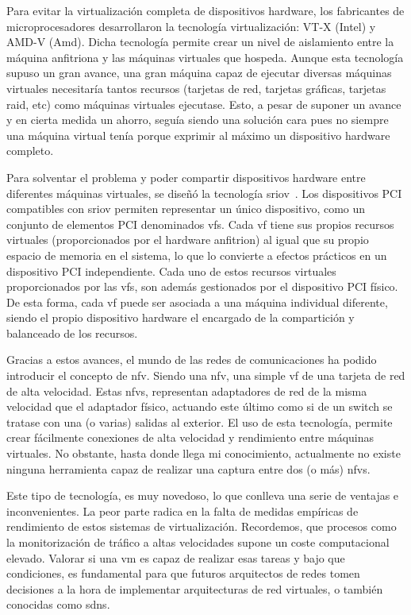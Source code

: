 Para evitar la virtualización completa de dispositivos hardware, los fabricantes de microprocesadores desarrollaron la tecnología virtualización: VT-X (Intel) y AMD-V (Amd). Dicha tecnología permite crear un nivel de aislamiento entre la máquina anfitriona y las máquinas virtuales que hospeda. Aunque esta tecnología supuso un gran avance, una gran máquina capaz de ejecutar diversas máquinas virtuales necesitaría tantos recursos (tarjetas de red, tarjetas gráficas, tarjetas raid, etc) como máquinas virtuales ejecutase. Esto, a pesar de suponer un avance y en cierta medida un ahorro, seguía siendo una solución cara pues no siempre una máquina virtual tenía porque exprimir al máximo un dispositivo hardware completo.

Para solventar el problema y poder compartir dispositivos hardware entre diferentes máquinas virtuales, se diseñó la tecnología \gls{sriov}~\cite{bib:introduccion:sriov}.
Los dispositivos PCI compatibles con \gls{sriov} permiten representar un único dispositivo, como un conjunto de elementos PCI denominados \glspl{vf}. Cada \gls{vf} tiene sus propios recursos virtuales (proporcionados por el hardware anfitrion) al igual que su propio espacio de memoria en el sistema, lo que lo convierte a efectos prácticos en un dispositivo PCI independiente. Cada uno de estos recursos virtuales proporcionados por las \glspl{vf}, son además gestionados por el dispositivo PCI físico. De esta forma, cada \gls{vf} puede ser asociada a una máquina individual diferente, siendo el propio dispositivo hardware el encargado de la compartición y balanceado de los recursos.

Gracias a estos avances, el mundo de las redes de comunicaciones ha podido introducir el concepto de \gls{nfv}. Siendo una \gls{nfv}, una simple \gls{vf} de una tarjeta de red de alta velocidad. Estas \glspl{nfv}, representan adaptadores de red de la misma velocidad que el adaptador físico, actuando este último como si de un switch se tratase con una (o varias) salidas al exterior. El uso de esta tecnología, permite crear fácilmente conexiones de alta velocidad y rendimiento entre máquinas virtuales. No obstante, hasta donde llega mi conocimiento, actualmente no existe ninguna herramienta capaz de realizar una captura entre dos (o más) \glspl{nfv}.

Este tipo de tecnología, es muy novedoso, lo que conlleva una serie de ventajas e inconvenientes. La peor parte radica en la falta de medidas empíricas de rendimiento de estos sistemas de virtualización. Recordemos, que procesos como la monitorización de tráfico a altas velocidades supone un coste computacional elevado. Valorar si una \gls{vm} es capaz de realizar esas tareas y bajo que condiciones, es fundamental para que futuros arquitectos de redes tomen decisiones a la hora de implementar arquitecturas de red virtuales, o también conocidas como \glspl{sdn}.

